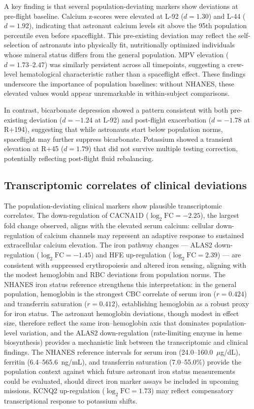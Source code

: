 \documentclass[11pt,a4paper]{article}
\begin{document}
A key finding is that several population-deviating markers show deviations at pre-flight baseline. Calcium z-scores were elevated at L-92 ($d = 1.30$) and L-44 ($d = 1.92$), indicating that astronaut calcium levels sit above the 95th population percentile even before spaceflight. This pre-existing deviation may reflect the self-selection of astronauts into physically fit, nutritionally optimized individuals whose mineral status differs from the general population. MPV elevation ($d = 1.73$--$2.47$) was similarly persistent across all timepoints, suggesting a crew-level hematological characteristic rather than a spaceflight effect. These findings underscore the importance of population baselines: without NHANES, these elevated values would appear unremarkable in within-subject comparisons.

In contrast, bicarbonate depression showed a pattern consistent with both pre-existing deviation ($d = -1.24$ at L-92) and post-flight exacerbation ($d = -1.78$ at R+194), suggesting that while astronauts start below population norms, spaceflight may further suppress bicarbonate. Potassium showed a transient elevation at R+45 ($d = 1.79$) that did not survive multiple testing correction, potentially reflecting post-flight fluid rebalancing.

\subsection{Transcriptomic correlates of clinical deviations}

The population-deviating clinical markers show plausible transcriptomic correlates. The down-regulation of CACNA1D ($\log_2\text{FC} = -2.25$), the largest fold change observed, aligns with the elevated serum calcium: cellular down-regulation of calcium channels may represent an adaptive response to sustained extracellular calcium elevation. The iron pathway changes --- ALAS2 down-regulation ($\log_2\text{FC} = -1.45$) and HFE up-regulation ($\log_2\text{FC} = 2.39$) --- are consistent with suppressed erythropoiesis and altered iron sensing, aligning with the modest hemoglobin and RBC deviations from population norms. The NHANES iron status reference strengthens this interpretation: in the general population, hemoglobin is the strongest CBC correlate of serum iron ($r = 0.424$) and transferrin saturation ($r = 0.412$), establishing hemoglobin as a robust proxy for iron status. The astronaut hemoglobin deviations, though modest in effect size, therefore reflect the same iron--hemoglobin axis that dominates population-level variation, and the ALAS2 down-regulation (rate-limiting enzyme in heme biosynthesis) provides a mechanistic link between the transcriptomic and clinical findings. The NHANES reference intervals for serum iron (24.0--160.0~$\mu$g/dL), ferritin (6.4--565.6~ng/mL), and transferrin saturation (7.0--55.0\%) provide the population context against which future astronaut iron status measurements could be evaluated, should direct iron marker assays be included in upcoming missions. KCNQ2 up-regulation ($\log_2\text{FC} = 1.73$) may reflect compensatory transcriptional response to potassium shifts.
\end{document}
